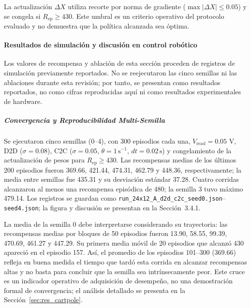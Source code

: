 La actualización $\Delta X$ utiliza recorte por norma de gradiente
($\max|\Delta X| \le 0.05$) y se congela si
$R_{\text{ep}} \ge 430$. Este umbral es un criterio operativo del
protocolo evaluado y no demuestra que la política alcanzada sea óptima.

\paragraph{Resultados de simulación y discusión en control robótico}

Los valores de recompensa y ablación de esta sección proceden de
registros de simulación previamente reportados. No se reejecutaron las
cinco semillas ni las ablaciones durante esta revisión; por tanto, se
presentan como resultados reportados, no como cifras reproducidas aquí
ni como resultados experimentales de hardware.

\subparagraph{Convergencia y Reproducibilidad Multi-Semilla}
Se ejecutaron cinco semillas (0--4), con 300 episodios cada una, $V_{\mathrm{read}}=0.05$ V, D2D ($\sigma=0.08$), C2C ($\sigma=0.05$, $\theta=1\,\mathrm{s}^{-1}$, $dt=0.02\,\mathrm{s}$) y congelamiento de la actualización de pesos para $R_{\mathrm{ep}}\geq430$. Las recompensas medias de los últimos 200 episodios fueron 369.66, 421.44, 474.31, 462.79 y 448.36, respectivamente; la media entre semillas fue 435.31 y su desviación estándar 37.28. Cuatro corridas alcanzaron al menos una recompensa episódica de 480; la semilla 3 tuvo máximo 479.14. Los registros se guardan como \texttt{run\_24x12\_A\_d2d\_c2c\_seed0.json}--\texttt{seed4.json}; la figura y discusión se presentan en la Sección~3.4.1.

La media de la semilla 0 debe interpretarse considerando su trayectoria:
las recompensas medias por bloques de 50 episodios fueron 13.90,
58.55, 99.39, 470.69, 461.27 y 447.29. Su primera media móvil de
20 episodios que alcanzó 430 apareció en el episodio 157. Así, el
promedio de los episodios 101--300 (369.66) refleja en buena medida el
tiempo que tardó esta corrida en alcanzar recompensas altas y no basta
para concluir que la semilla sea intrínsecamente peor. Este cruce es
un indicador operativo de adquisición de desempeño, no una
demostración formal de convergencia; el análisis detallado se presenta
en la Sección~\ref{sec:res_cartpole}.

